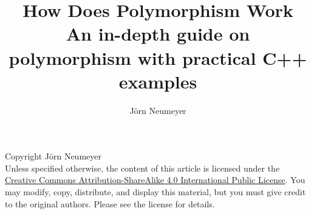 \documentclass{article}
\title{
\Huge How Does Polymorphism Work
\\[.5cm]
\Large An in-depth guide on polymorphism with practical C++ examples}
\author{J\"orn Neumeyer}
\begin{document}
  \maketitle
  Copyright \textcopyright {} J\"orn Neumeyer\\
  Unless specified otherwise, the content of this article is licensed under the \href{https://creativecommons.org/licenses/by-sa/4.0/legalcode}{Creative Commons Attribution-ShareAlike 4.0 International Public License}.
  You may modify, copy, distribute, and display this material, but you must give credit to the original authors. Please see the license for details.
  \tableofcontents
\end{document}
